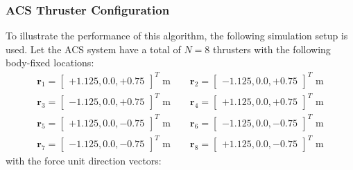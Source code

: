 \subsubsection{ACS Thruster Configuration}\label{sec:ACSConfig}
To illustrate the performance of this algorithm, the following simulation setup is used.  Let the ACS system have a total of $N = 8$ thrusters with the following body-fixed locations:
\begin{gather*}
	\label{eq:th:loc}
	\bm r_{1} = \begin{bmatrix} +1.125, 0.0, +0.75  \end{bmatrix}^{T} \text{ m}
	\quad\quad
	\bm r_{2} = \begin{bmatrix} -1.125, 0.0, +0.75  \end{bmatrix}^{T} \text{ m}
	\\
	\bm r_{3} = \begin{bmatrix} -1.125, 0.0, +0.75  \end{bmatrix}^{T}	 \text{ m}
	\quad\quad
	\bm r_{4} = \begin{bmatrix} +1.125, 0.0, +0.75  \end{bmatrix}^{T} \text{ m}
	\\
	\bm r_{5} = \begin{bmatrix} +1.125, 0.0, -0.75  \end{bmatrix}^{T}	 \text{ m}
	\quad\quad
	\bm r_{6} = \begin{bmatrix} -1.125, 0.0, -0.75  \end{bmatrix}^{T} \text{ m}
	\\
	\bm r_{7} = \begin{bmatrix} -1.125, 0.0, -0.75  \end{bmatrix}^{T}	 \text{ m}
	\quad\quad
	\bm r_{8} = \begin{bmatrix} +1.125, 0.0, -0.75  \end{bmatrix}^{T} \text{ m}
\end{gather*}
with the force unit direction vectors:
